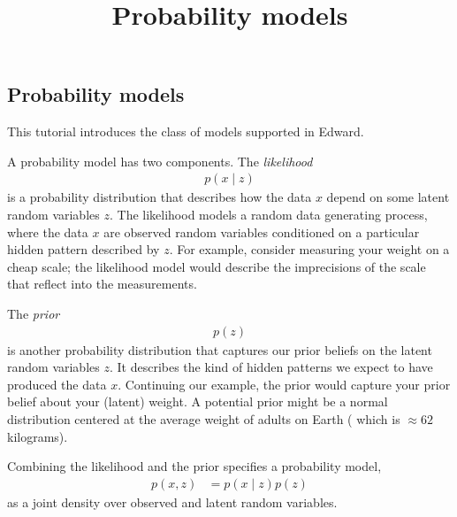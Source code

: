 \title{Probability models}

\subsection{Probability models}

This tutorial introduces the class of models supported in Edward.


A probability model has two components. The \emph{likelihood}
\begin{align*}
  p(x \mid z)
\end{align*}
is a probability distribution that describes how the data $x$ depend on some
latent random variables $z$. The likelihood models a random data generating
process, where the data $x$ are observed random variables conditioned on a
particular hidden pattern described by $z$. For example, consider measuring your
weight on a cheap scale; the likelihood model would describe the imprecisions
of the scale that reflect into the measurements.

The \emph{prior}
\begin{align*}
  p(z)
\end{align*}
is another probability distribution that captures our prior beliefs on
the latent random variables $z$. It describes the kind of hidden patterns we
expect to have produced the data $x$. Continuing our example, the prior would
capture your prior belief about your (latent) weight. A potential prior might be
a normal distribution centered at the average weight of adults on Earth (
which is $\approx62$ kilograms).

Combining the likelihood and the prior specifies a probability model,
\begin{align*}
  p(x,z)
  &=
  p(x \mid z)
  p(z)
\end{align*}
as a joint density over observed and latent random variables.
